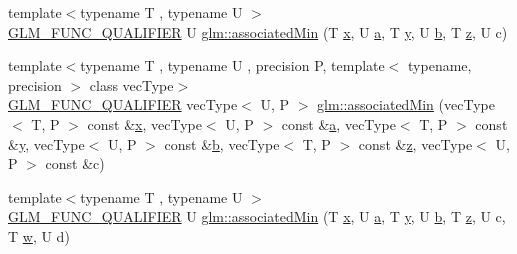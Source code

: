 \begin{DoxyCompactItemize}
\item 
{\footnotesize template$<$typename T , typename U $>$ }\\\mbox{\hyperlink{setup_8hpp_a33fdea6f91c5f834105f7415e2a64407}{G\+L\+M\+\_\+\+F\+U\+N\+C\+\_\+\+Q\+U\+A\+L\+I\+F\+I\+ER}} U \mbox{\hyperlink{group__gtx__associated__min__max_gad0aa8f86259a26d839d34a3577a923fc}{glm\+::associated\+Min}} (T \mbox{\hyperlink{glad_8h_a92d0386e5c19fb81ea88c9f99644ab1d}{x}}, U \mbox{\hyperlink{glad_8h_ac8729153468b5dcf13f971b21d84d4e5}{a}}, T \mbox{\hyperlink{glad_8h_a66ddd433d2cacfe27f5906b7e86faeed}{y}}, U \mbox{\hyperlink{glad_8h_a6eba317e3cf44d6d26c04a5a8f197dcb}{b}}, T \mbox{\hyperlink{glad_8h_acb78bf1972d3eaf07da34ff2e0a2f133}{z}}, U c)
\item 
{\footnotesize template$<$typename T , typename U , precision P, template$<$ typename, precision $>$ class vec\+Type$>$ }\\\mbox{\hyperlink{setup_8hpp_a33fdea6f91c5f834105f7415e2a64407}{G\+L\+M\+\_\+\+F\+U\+N\+C\+\_\+\+Q\+U\+A\+L\+I\+F\+I\+ER}} vec\+Type$<$ U, P $>$ \mbox{\hyperlink{group__gtx__associated__min__max_ga5bc6b9acbf9e060d58a342fbe3b73d43}{glm\+::associated\+Min}} (vec\+Type$<$ T, P $>$ const \&\mbox{\hyperlink{glad_8h_a92d0386e5c19fb81ea88c9f99644ab1d}{x}}, vec\+Type$<$ U, P $>$ const \&\mbox{\hyperlink{glad_8h_ac8729153468b5dcf13f971b21d84d4e5}{a}}, vec\+Type$<$ T, P $>$ const \&\mbox{\hyperlink{glad_8h_a66ddd433d2cacfe27f5906b7e86faeed}{y}}, vec\+Type$<$ U, P $>$ const \&\mbox{\hyperlink{glad_8h_a6eba317e3cf44d6d26c04a5a8f197dcb}{b}}, vec\+Type$<$ T, P $>$ const \&\mbox{\hyperlink{glad_8h_acb78bf1972d3eaf07da34ff2e0a2f133}{z}}, vec\+Type$<$ U, P $>$ const \&c)
\item 
{\footnotesize template$<$typename T , typename U $>$ }\\\mbox{\hyperlink{setup_8hpp_a33fdea6f91c5f834105f7415e2a64407}{G\+L\+M\+\_\+\+F\+U\+N\+C\+\_\+\+Q\+U\+A\+L\+I\+F\+I\+ER}} U \mbox{\hyperlink{group__gtx__associated__min__max_ga432224ebe2085eaa2b63a077ecbbbff6}{glm\+::associated\+Min}} (T \mbox{\hyperlink{glad_8h_a92d0386e5c19fb81ea88c9f99644ab1d}{x}}, U \mbox{\hyperlink{glad_8h_ac8729153468b5dcf13f971b21d84d4e5}{a}}, T \mbox{\hyperlink{glad_8h_a66ddd433d2cacfe27f5906b7e86faeed}{y}}, U \mbox{\hyperlink{glad_8h_a6eba317e3cf44d6d26c04a5a8f197dcb}{b}}, T \mbox{\hyperlink{glad_8h_acb78bf1972d3eaf07da34ff2e0a2f133}{z}}, U c, T \mbox{\hyperlink{glad_8h_a1d0296e9e835f2e1ee17634af95fc1ec}{w}}, U d)
\item 

\end{DoxyCompactItemize}
